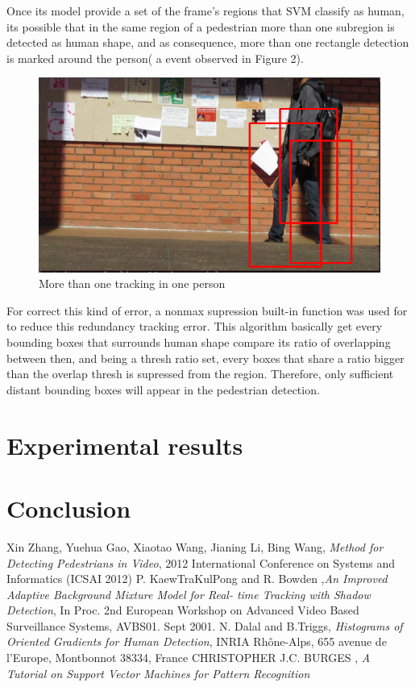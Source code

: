 \documentclass[conference]{IEEEtran}
\begin{document}
	Once its model provide a set of the frame's regions that SVM classify as human, its possible that in the same region of a pedestrian more than one subregion is detected as human shape, and as consequence, more than one rectangle detection is marked around the person( a event observed in Figure 2).
	
	\begin{figure}[htbp]
	\centerline{\includegraphics[scale=0.5]{Non_max.png}}
	\caption{More than one tracking in one person}
	\label{fig}
	\end{figure}
	
	For correct this kind of error, a nonmax supression built-in function was used for to reduce this redundancy tracking error. This algorithm basically get every bounding boxes that surrounds human shape compare its ratio of overlapping between then, and being a thresh ratio set, every boxes that share a ratio bigger than the overlap thresh is supressed from the region. Therefore, only sufficient distant bounding boxes will appear in the pedestrian detection.

\section{Experimental results}

\section{Conclusion}

\begin{thebibliography}{00}
 Xin Zhang, Yuehua Gao, Xiaotao Wang, Jianing Li, Bing Wang, \textit{Method for Detecting Pedestrians in Video}, 2012 International Conference on Systems and Informatics (ICSAI 2012) 
 P. KaewTraKulPong and R. Bowden ,\textit{An Improved Adaptive Background Mixture Model for Real-
time Tracking with Shadow Detection}, In Proc. 2nd European Workshop on Advanced Video Based Surveillance Systems, AVBS01. Sept 2001.
 N. Dalal and B.Triggs, \textit{Histograms of Oriented Gradients for Human Detection}, INRIA Rhône-Alps, 655 avenue de l’Europe, Montbonnot 38334, France 
 CHRISTOPHER J.C. BURGES , \textit{A Tutorial on Support Vector Machines for Pattern Recognition}
\end{thebibliography}
\vspace{12pt}
\end{document}
